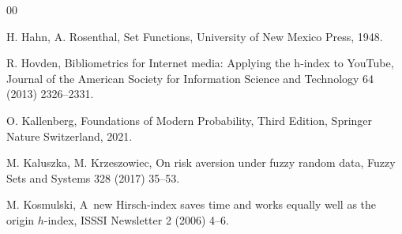 \documentclass[preprint,11pt]{elsarticle}
\theoremstyle{definition}
\begin{document}
\begin{thebibliography}{00}




 H. Hahn, A. Rosenthal, Set Functions, University of New Mexico Press, 1948.

 R. Hovden, Bibliometrics for Internet media: Applying the h‐index to YouTube, Journal of the American Society for Information Science and Technology 64 (2013) 2326--2331.

  O. Kallenberg, Foundations of Modern Probability, Third Edition, Springer Nature Switzerland, 2021.








 M. Kaluszka, M. Krzeszowiec, On risk aversion under fuzzy random data, Fuzzy Sets and Systems 328 (2017) 35--53.

 M. Kosmulski,  A~new Hirsch-index saves time and works equally well as the origin $h$-index, ISSSI Newsletter 2 (2006) 4--6.


\end{thebibliography}
\end{document}
